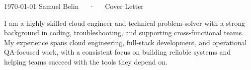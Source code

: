\documentclass[11pt, a4paper]{awesome-cv}
\begin{document}
\makecvheader[C]

\makecvfooter
  {\today}
  {Samuel Belin~~~·~~~Cover Letter}
  {}

\makelettertitle

\begin{cvletter}

I am a highly skilled cloud engineer and technical problem-solver with a strong background in coding, troubleshooting, and supporting cross-functional teams. My experience spans cloud engineering, full-stack development, and operational QA-focused work, with a consistent focus on building reliable systems and helping teams succeed with the tools they depend on.


\end{cvletter}
\end{document}
